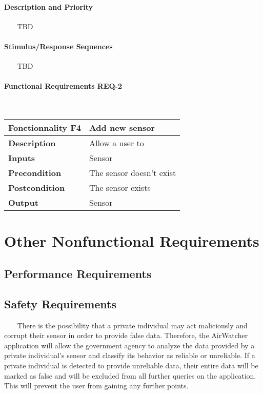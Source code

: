 \documentclass{report}
\begin{document}
\subsubsection*{Description and Priority} ~~~
TBD

\subsubsection*{Stimulus/Response Sequences} ~~~
TBD

\subsubsection*{Functional Requirements REQ-2} ~~~
\begin{center}
	\begin{tabular}{|m{4cm}|m{10cm}|}
	\hline
	\textbf{Fonctionnality F4} & Add new sensor \\
	\hline
	\textbf{Description} & Allow a user to  \\
	\hline
	\textbf{Inputs} & Sensor \\
	\hline
	\textbf{Precondition} & The sensor doesn't exist  \\
	\hline
	\textbf{Postcondition} & The sensor exists \\
	\hline
	\textbf{Output} & Sensor \\
	\hline
	\end{tabular}
\end{center}

\chapter{Other Nonfunctional Requirements}

\section{Performance Requirements}

\section{Safety Requirements} ~~~
There is the possibility that a private individual may act maliciously and corrupt their sensor in order
to provide false data. Therefore, the AirWatcher application will allow the government agency to
analyze the data provided by a private individual’s sensor and classify its behavior as reliable or
unreliable. If a private individual is detected to provide unreliable data, their entire data will be
marked as false and will be excluded from all further queries on the application. This will prevent the
user from gaining any further points.
\end{document}
